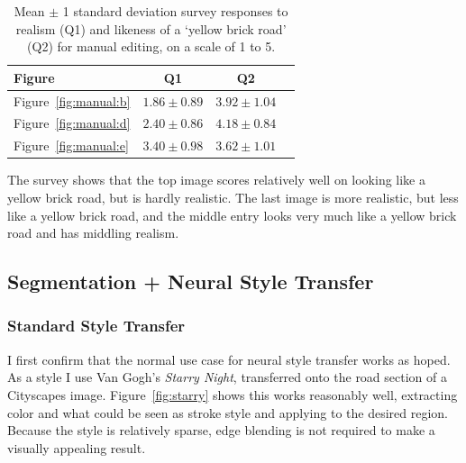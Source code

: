 \documentclass[10pt,twocolumn,letterpaper]{article}
\begin{document}
\begin{table}[htb]
\caption{Mean $\pm$ 1 standard deviation survey responses to realism (Q1) and likeness of a `yellow brick road' (Q2) for manual editing, on a scale of 1 to 5.}
\vskip 0.15in
\begin{center}
\begin{small}
\begin{sc}
\begin{tabular}{lccr}
\toprule
Figure				 		& Q1	& Q2 \\
\midrule
Figure~\ref{fig:manual:b} 	& $1.86 \pm 0.89$	& $3.92 \pm 1.04$  \\
Figure~\ref{fig:manual:d}	& $2.40 \pm 0.86$	& $4.18 \pm 0.84$  \\
Figure~\ref{fig:manual:e}	& $3.40 \pm 0.98$	& $3.62 \pm 1.01$  \\
\bottomrule
\end{tabular}
\end{sc}
\end{small}
\end{center}
\vskip -0.1in
\label{tab:model_accuracies}
\end{table}

The survey shows that the top image scores relatively well on looking like a yellow brick road, but is hardly realistic. The last image is more realistic, but less like a yellow brick road, and the middle entry looks very much like a yellow brick road and has middling realism.



\subsection{Segmentation + Neural Style Transfer}

\subsubsection{Standard Style Transfer}
I first confirm that the normal use case for neural style transfer works as hoped. As a style I use Van Gogh's \textit{Starry Night}, transferred onto the road section of a Cityscapes image. Figure~\ref{fig:starry} shows this works reasonably well, extracting color and what could be seen as stroke style and applying to the desired region. Because the style is relatively sparse, edge blending is not required to make a visually appealing result.
\end{document}

